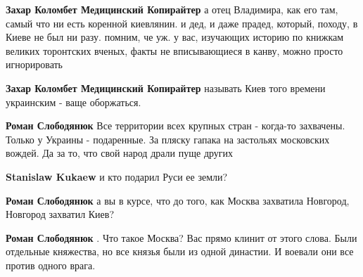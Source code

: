 \begin{itemize}
\begin{itemize}
\textbf{Захар Коломбет Медицинский Копирайтер} а отец Владимира, как его там, самый что ни есть коренной киевлянин. и дед, и даже прадед, который, походу, в Киеве не был ни разу. помним, че уж. у вас, изучающих историю по книжкам великих торонтских вченых, факты не вписывающиеся в канву, можно просто игнорировать

 
\textbf{Захар Коломбет Медицинский Копирайтер} называть Киев того времени украинским - ваще оборжаться.

 
\textbf{Роман Слободянюк} Все территории всех крупных стран - когда-то захвачены. Только у Украины - подаренные. За пляску гапака на застольях московских вождей. Да за то, что свой народ драли пуще других

 
\textbf{Stanislaw Kukaew} и кто подарил Руси ее земли?

 
\textbf{Роман Слободянюк} а вы в курсе, что до того, как Москва захватила Новгород, Новгород захватил Киев?

 
\textbf{Роман Слободянюк} . Что такое Москва? Вас прямо клинит от этого слова. Были отдельные княжества, но все князья были из одной династии. И воевали они все против одного врага.

 

\end{itemize}
\end{itemize}
